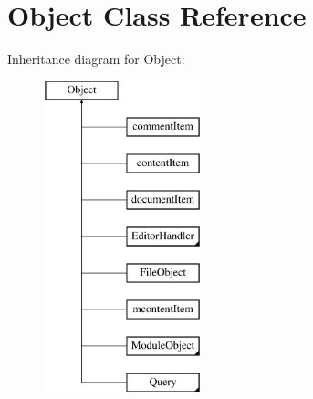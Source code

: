 \hypertarget{classObject}{}\section{Object Class Reference}
\label{classObject}
Inheritance diagram for Object\+:\begin{figure}[H]
\begin{center}
\leavevmode
\includegraphics[height=9.000000cm]{classObject}
\end{center}
\end{figure}
